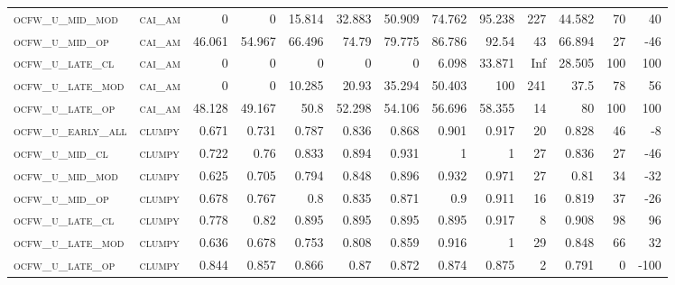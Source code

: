 \begin{landscape}
\begin{center}
\begin{footnotesize}
\begin{longtable}{llrrrrrrrr|rrr}
\textsc{ocfw\_u\_mid\_mod  } & \textsc{cai\_am   }   & 0        & 0        & 15.814   & 32.883   & 50.909   & 74.762   & 95.238    & 227    & 44.582        & 70            & 40              \\
\textsc{ocfw\_u\_mid\_op   } & \textsc{cai\_am   }   & 46.061   & 54.967   & 66.496   & 74.79    & 79.775   & 86.786   & 92.54     & 43     & 66.894        & 27            & -46             \\
\textsc{ocfw\_u\_late\_cl  } & \textsc{cai\_am   }   & 0        & 0        & 0        & 0        & 0        & 6.098    & 33.871    & Inf    & 28.505        & 100           & 100             \\
\textsc{ocfw\_u\_late\_mod } & \textsc{cai\_am   }   & 0        & 0        & 10.285   & 20.93    & 35.294   & 50.403   & 100       & 241    & 37.5          & 78            & 56              \\
\textsc{ocfw\_u\_late\_op  } & \textsc{cai\_am   }   & 48.128   & 49.167   & 50.8     & 52.298   & 54.106   & 56.696   & 58.355    & 14     & 80            & 100           & 100             \\
\textsc{ocfw\_u\_early\_all} & \textsc{clumpy    }   & 0.671    & 0.731    & 0.787    & 0.836    & 0.868    & 0.901    & 0.917     & 20     & 0.828         & 46            & -8              \\
\textsc{ocfw\_u\_mid\_cl   } & \textsc{clumpy    }   & 0.722    & 0.76     & 0.833    & 0.894    & 0.931    & 1        & 1         & 27     & 0.836         & 27            & -46             \\
\textsc{ocfw\_u\_mid\_mod  } & \textsc{clumpy    }   & 0.625    & 0.705    & 0.794    & 0.848    & 0.896    & 0.932    & 0.971     & 27     & 0.81          & 34            & -32             \\
\textsc{ocfw\_u\_mid\_op   } & \textsc{clumpy    }   & 0.678    & 0.767    & 0.8      & 0.835    & 0.871    & 0.9      & 0.911     & 16     & 0.819         & 37            & -26             \\
\textsc{ocfw\_u\_late\_cl  } & \textsc{clumpy    }   & 0.778    & 0.82     & 0.895    & 0.895    & 0.895    & 0.895    & 0.917     & 8      & 0.908         & 98            & 96              \\
\textsc{ocfw\_u\_late\_mod } & \textsc{clumpy    }   & 0.636    & 0.678    & 0.753    & 0.808    & 0.859    & 0.916    & 1         & 29     & 0.848         & 66            & 32              \\
\textsc{ocfw\_u\_late\_op  } & \textsc{clumpy    }   & 0.844    & 0.857    & 0.866    & 0.87     & 0.872    & 0.874    & 0.875     & 2      & 0.791         & 0             & -100            \\

\end{longtable}
\end{footnotesize}
\end{center}
\end{landscape}
